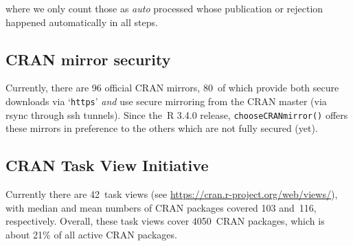 \noindent where we only count those as \emph{auto} processed whose publication or
rejection happened automatically in all steps.

\hypertarget{cran-mirror-security}{%
\subsection{CRAN mirror security}\label{cran-mirror-security}}

Currently, there are 96 official CRAN mirrors,
80~of which provide both
secure downloads via `\texttt{https}' \emph{and} use secure mirroring from the CRAN master
(via rsync through ssh tunnels). Since the~R 3.4.0 release, \texttt{chooseCRANmirror()}
offers these mirrors in preference to the others which are not fully secured (yet).

\hypertarget{cran-task-view-initiative}{%
\subsection{CRAN Task View Initiative}\label{cran-task-view-initiative}}

Currently there are 42~task views (see \url{https://cran.r-project.org/web/views/}),
with median and mean numbers of CRAN packages covered
103 and~116, respectively.
Overall, these task views cover 4050~CRAN packages,
which is about 21\% of all active CRAN packages.


\address{%
Kurt Hornik\\
WU Wirtschaftsuniversität Wien\\%
Austria\\
%
%
\textit{ORCiD: \href{https://orcid.org/0000-0003-4198-9911}{0000-0003-4198-9911}}\\%
\href{mailto:Kurt.Hornik@R-project.org}{\nolinkurl{Kurt.Hornik@R-project.org}}%
}

\address{%
Uwe Ligges\\
TU Dortmund\\%
Germany\\
%
%
\textit{ORCiD: \href{https://orcid.org/0000-0001-5875-6167}{0000-0001-5875-6167}}\\%
\href{mailto:Uwe.Ligges@R-project.org}{\nolinkurl{Uwe.Ligges@R-project.org}}%
}

\address{%
Achim Zeileis\\
Universität Innsbruck\\%
Austria\\
%
%
\textit{ORCiD: \href{https://orcid.org/0000-0003-0918-3766}{0000-0003-0918-3766}}\\%
\href{mailto:Achim.Zeileis@R-project.org}{\nolinkurl{Achim.Zeileis@R-project.org}}%
}
